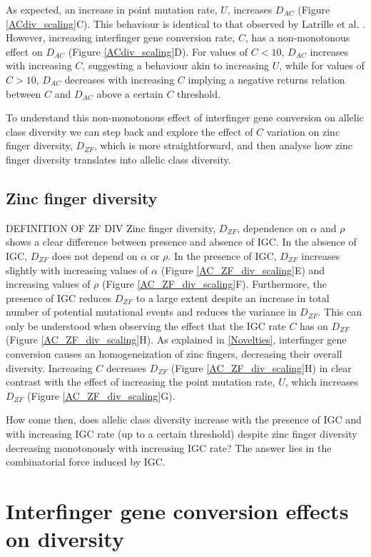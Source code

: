 \documentclass[a4paper,10pt]{article}
\begin{document}
As expected, an increase in point mutation rate, $U$, increases $D_{AC}$ (Figure \ref{ACdiv_scaling}C). This behaviour is identical to that observed by Latrille et al. \cite{Latrille2017}. However, increasing interfinger gene conversion rate, $C$, has a non-monotonous effect on $D_{AC}$ (Figure \ref{ACdiv_scaling}D). For values of $C < 10$, $D_{AC}$ increases with increasing $C$, suggesting a behaviour akin to increasing $U$, while for values of $C > 10$, $D_{AC}$ decreases with increasing $C$ implying a negative returns relation between $C$ and $D_{AC}$ above a certain $C$ threshold. 

To understand this non-monotonous effect of interfinger gene conversion on allelic class diversity we can step back and explore the effect of $C$ variation on zinc finger diversity, $D_{ZF}$, which is more straightforward, and then analyse how zinc finger diversity translates into allelic class diversity. 


\subsection{Zinc finger diversity}
DEFINITION OF ZF DIV
Zinc finger diversity, $D_{ZF}$, dependence on $\alpha$ and $\rho$ shows a clear difference between presence and absence of IGC. In the absence of IGC, $D_{ZF}$ does not depend on $\alpha$ or $\rho$. In the presence of IGC, $D_{ZF}$ increases slightly with increasing values of $\alpha$ (Figure \ref{AC_ZF_div_scaling}E) and increasing values of $\rho$ (Figure \ref{AC_ZF_div_scaling}F). Furthermore, the presence of IGC reduces $D_{ZF}$ to a large extent despite an increase in total number of potential mutational events and reduces the variance in $D_{ZF}$. This can only be understood when observing the effect that the IGC rate $C$ has on $D_{ZF}$ (Figure \ref{AC_ZF_div_scaling}H). As explained in \ref{Novelties}, interfinger gene conversion causes an homogeneization of zinc fingers, decreasing their overall diversity. Increasing $C$ decreases $D_{ZF}$ (Figure \ref{AC_ZF_div_scaling}H) in clear contrast with the effect of increasing the point mutation rate, $U$, which increases $D_{ZF}$ (Figure \ref{AC_ZF_div_scaling}G). 

How come then, does allelic class diversity increase with the presence of IGC and with increasing IGC rate (up to a certain threshold) despite zinc finger diversity decreasing monotonously with increasing IGC rate? The answer lies in the combinatorial force induced by IGC.


\section{Interfinger gene conversion effects on diversity}
\end{document}
